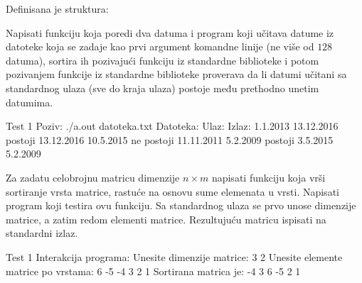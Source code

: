 \begin{Answer}[ref=524]
\end{Answer}
\begin{Exercise}[label=525]
  Definisana je struktura:
  \begin{ckod}
    typedef struct { int dan; int mesec; int godina; } Datum;}
  \end{ckod}
  Napisati funkciju koja poredi dva datuma i program koji učitava
  datume iz datoteke koja se zadaje kao prvi argument komandne linije
  (ne više od $128$ datuma), sortira ih pozivajući funkciju
   iz standardne biblioteke i potom pozivanjem funkcije
   iz standardne biblioteke proverava da li datumi
  učitani sa standardnog ulaza (sve do kraja ulaza) postoje među
  prethodno unetim datumima.
  
\begin{maxitest}
\begin{test}{Test 1}
Poziv: ./a.out datoteka.txt
Datoteka:            Ulaz:             Izlaz:
1.1.2013             13.12.2016        postoji
13.12.2016           10.5.2015         ne postoji
11.11.2011           5.2.2009          postoji
3.5.2015
5.2.2009
\end{test}
\end{maxitest}
  
\end{Exercise}

\begin{Exercise}[label=526]
  Za zadatu celobrojnu matricu dimenzije $n \times m$ napisati
  funkciju koja vrši sortiranje vrsta matrice, rastuće na osnovu sume
  elemenata u vrsti. Napisati program koji testira ovu funkciju. Sa
  standardnog ulaza se prvo unose dimenzije matrice, a zatim redom
  elementi matrice. Rezultujuću matricu ispisati na standardni izlaz.

\begin{maxitest}
\begin{test}{Test 1}
Interakcija programa:    
  Unesite dimenzije matrice: 3 2
  Unesite elemente matrice po vrstama:
  6 -5
  -4 3
  2 1
  Sortirana matrica je:
  -4 3 
  6 -5 
  2 1   
\end{test}
\end{maxitest}

\end{Exercise}

